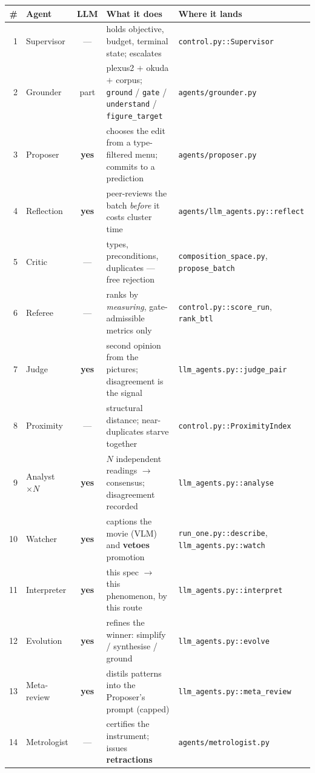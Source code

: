 \documentclass[11pt]{article}
\newcommand{\code}[1]{\texttt{#1}}
\begin{document}
\begin{table}[t]\centering\scriptsize
\begin{tabular}{@{}rlcp{5.6cm}p{4.4cm}@{}}
\toprule
\# & \textbf{Agent} & \textbf{LLM} & \textbf{What it does} & \textbf{Where it lands} \\
\midrule
1 & Supervisor & --- & holds objective, budget, terminal state; escalates & \code{control.py::Supervisor} \\
2 & Grounder & part & plexus2 $+$ okuda $+$ corpus; \code{ground} / \code{gate} / \code{understand} / \code{figure\_target} & \code{agents/grounder.py} \\
3 & Proposer & \textbf{yes} & chooses the edit from a type-filtered menu; commits to a prediction & \code{agents/proposer.py} \\
4 & Reflection & \textbf{yes} & peer-reviews the batch \emph{before} it costs cluster time & \code{agents/llm\_agents.py::reflect} \\
5 & Critic & --- & types, preconditions, duplicates --- free rejection & \code{composition\_space.py}, \code{propose\_batch} \\
6 & Referee & --- & ranks by \emph{measuring}, gate-admissible metrics only & \code{control.py::score\_run}, \code{rank\_btl} \\
7 & Judge & \textbf{yes} & second opinion from the pictures; disagreement is the signal & \code{llm\_agents.py::judge\_pair} \\
8 & Proximity & --- & structural distance; near-duplicates starve together & \code{control.py::ProximityIndex} \\
9 & Analyst $\times N$ & \textbf{yes} & $N$ independent readings $\to$ consensus; disagreement recorded & \code{llm\_agents.py::analyse} \\
10 & Watcher & \textbf{yes} & captions the movie (VLM) and \textbf{vetoes} promotion & \code{run\_one.py::describe}, \code{llm\_agents.py::watch} \\
11 & Interpreter & \textbf{yes} & this spec $\to$ this phenomenon, by this route & \code{llm\_agents.py::interpret} \\
12 & Evolution & \textbf{yes} & refines the winner: simplify / synthesise / ground & \code{llm\_agents.py::evolve} \\
13 & Meta-review & \textbf{yes} & distils patterns into the Proposer's prompt (capped) & \code{llm\_agents.py::meta\_review} \\
14 & Metrologist & --- & certifies the instrument; issues \textbf{retractions} & \code{agents/metrologist.py} \\

\end{tabular}
\end{table}
\end{document}
